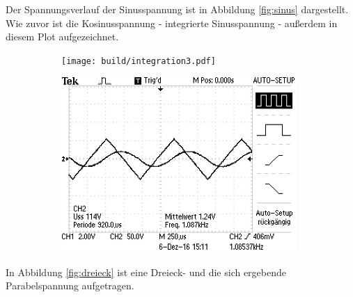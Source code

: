 Der Spannungsverlauf der Sinusspannung ist in Abbildung \ref{fig:sinus} dargestellt. Wie zuvor ist die Kosinusspannung - integrierte Sinusspannung - außerdem in diesem Plot aufgezeichnet.

\begin{figure}
	\caption{Aufgabenteil d: Dreiecksspannung}
	\label{fig:dreieck}
	\centering
	\begin{subfigure}{0.48\textwidth}
		\centering
		\texttt{[image: build/integration3.pdf]}
		\label{fig:intdreieck}
	\end{subfigure}
	\begin{subfigure}{0.48\textwidth}
		\centering
		\includegraphics[width=0.98\textwidth]{bilder/ALL0003/F0003TEK.JPG}
		\label{fig:dorig}
	\end{subfigure}

\end{figure}

In Abbildung \ref{fig:dreieck} ist eine Dreieck- und die sich ergebende Parabelspannung aufgetragen.
